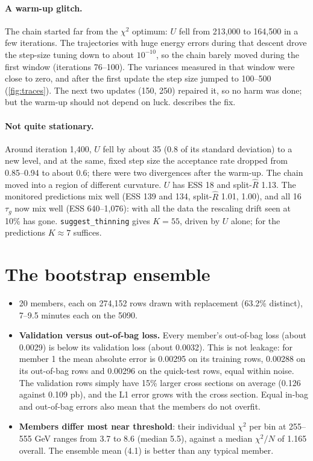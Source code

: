 \documentclass[11pt]{article}
\newcommand{\code}[1]{\texttt{#1}}
\begin{document}
\paragraph{A warm-up glitch.} The chain started far from the $\chi^2$ optimum: $U$ fell
from 213,000 to 164,500 in a few iterations. The trajectories with huge energy errors
during that descent drove the step-size tuning down to about $10^{-10}$, so the chain
barely moved during the first window (iterations 76--100). The variances measured in that
window were close to zero, and after the first update the step size jumped to 100--500
(\cref{fig:traces}). The next two updates (150, 250) repaired it, so no harm was done; but
the warm-up should not depend on luck.  describes the fix.

\paragraph{Not quite stationary.} Around iteration 1,400, $U$ fell by about 35 (0.8 of
its standard deviation) to a new level, and at the same, fixed step size the acceptance
rate dropped from 0.85--0.94 to about 0.6; there were two divergences after the warm-up.
The chain moved into a region of different curvature. $U$ has ESS 18 and split-$\hat R$
1.13. The monitored predictions mix well (ESS 139 and 134, split-$\hat R$ 1.01, 1.00), and
all 16 $\tau_g$ now mix well (ESS 640--1,076): with all the data the rescaling drift seen
at 10\% has gone. \code{suggest\_thinning} gives $K = 55$, driven by $U$ alone; for the
predictions $K \approx 7$ suffices.

\section{The bootstrap ensemble}
\label{sec:ensemble}

\begin{itemize}
  \item 20 members, each on 274,152 rows drawn with replacement (63.2\% distinct), 7--9.5
    minutes each on the 5090.
  \item \textbf{Validation versus out-of-bag loss.} Every member's out-of-bag loss (about
    0.0029) is below its validation loss (about 0.0032). This is not leakage: for member 1
    the mean absolute error is 0.00295 on its training rows, 0.00288 on its out-of-bag
    rows and 0.00296 on the quick-test rows, equal within noise. The validation rows simply
    have 15\% larger cross sections on average (0.126 against 0.109 pb), and the L1 error
    grows with the cross section. Equal in-bag and out-of-bag errors also mean that the
    members do not overfit.
  \item \textbf{Members differ most near threshold}: their individual $\chi^2$ per bin at
    255--555 GeV ranges from 3.7 to 8.6 (median 5.5), against a median $\chi^2/N$ of
    1.165 overall. The ensemble mean (4.1) is better than any typical member.
\end{itemize}
\end{document}
